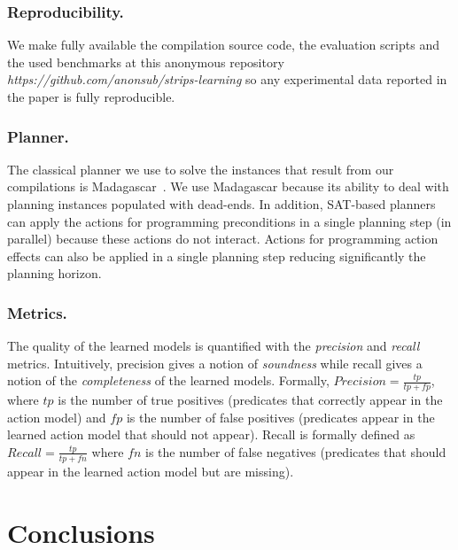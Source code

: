 \documentclass{article}
\begin{document}
\subsubsection{Reproducibility.}
We make fully available the compilation source code, the evaluation scripts and the used benchmarks at this anonymous repository {\em https://github.com/anonsub/strips-learning} so any experimental data reported in the paper is fully reproducible. 

\subsubsection{Planner.}
The classical planner we use to solve the instances that result from our compilations is {\sc Madagascar}~\cite{rintanen2014madagascar}. We use {\sc Madagascar} because its ability to deal with planning instances populated with dead-ends. In addition, SAT-based planners can apply the actions for programming preconditions in a single planning step (in parallel) because these actions do not interact. Actions for programming action effects can also be applied in a single planning step reducing significantly the planning horizon.

\subsubsection{Metrics.}
The quality of the learned models is quantified with the {\em precision} and {\em recall} metrics. Intuitively, precision gives a notion of {\em soundness} while recall gives a notion of the {\em completeness} of the learned models. Formally, $Precision=\frac{tp}{tp+fp}$, where $tp$ is the number of true positives (predicates that correctly appear in the action model) and $fp$ is the number of false positives (predicates appear in the learned action model that should not appear). Recall is formally defined as $Recall=\frac{tp}{tp+fn}$ where $fn$ is the number of false negatives (predicates that should appear in the learned action model but are missing).


\section{Conclusions}

\newpage



\end{document}
